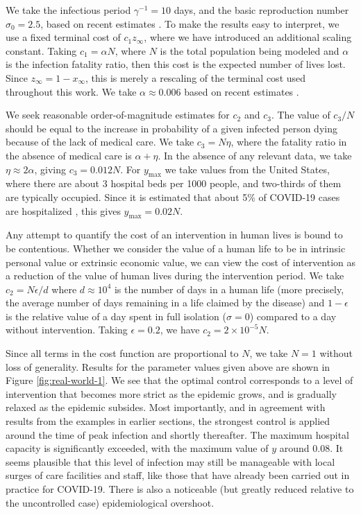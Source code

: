 \documentclass[english,12pt,letter]{article}
\newcommand{\Rnot}{\sigma_0}
\newcommand{\Sinf}{x_\infty}
\newcommand{\ymax}{y_\text{max}}
\begin{document}
We take the infectious period $\gamma^{-1}=10$ days, and the basic reproduction
number $\Rnot=2.5$, based on recent estimates \cite{verity2020estimates,liu2020reproductive}.
To make the results easy to interpret, we use a
fixed terminal cost of $c_1 z_\infty$, where we have introduced an additional
scaling constant.  Taking $c_1 = \alpha N$, where $N$ is the total population
being modeled and $\alpha$ is the infection fatality ratio, then this cost is
the expected number of lives lost.  Since $z_\infty=1-\Sinf$, this is merely a
rescaling of the terminal cost used throughout this work.  We take
$\alpha \approx 0.006$ based on recent estimates \cite{verity2020estimates,russell2020estimating,wu2020estimating}.

We seek reasonable order-of-magnitude estimates for $c_2$ and $c_3$.  
The value of $c_3/N$ should be equal to the increase in probability of a given
infected person dying because of the lack of medical care.  We take
$c_3 = N\eta$,
where the fatality ratio in the absence of medical care is $\alpha+\eta$.
In the absence of any relevant data, we take $\eta\approx 2\alpha$, giving
$c_3 = 0.012N$.  For $\ymax$ we take values from the United States, where
there are about 3 hospital beds per 1000 people, and two-thirds of them
are typically occupied.  Since it is estimated that about 5\% of COVID-19
cases are hospitalized \cite{verity2020estimates}, this gives $\ymax=0.02N$.

Any attempt to quantify the cost of an intervention in human lives is bound
to be contentious.  Whether we consider the value of a human life to be in
intrinsic personal value or extrinsic economic value, we can view the cost
of intervention as a reduction of the value of human lives during the intervention
period.  We take $c_2 = N\epsilon/d$ where $d\approx 10^4$ is the number
of days in a human life (more precisely, the average number of days remaining
in a life claimed by the disease) and $1-\epsilon$ is the relative value of a
day spent in full isolation ($\sigma=0$) compared to a day without intervention.
Taking $\epsilon=0.2$, we have $c_2 = 2\times10^{-5} N$.

Since all terms in the cost function are proportional to $N$, we take $N=1$ without
loss of generality.  Results for the parameter values given above are shown in Figure
\ref{fig:real-world-1}.  We see that the optimal control corresponds to a level
of intervention that becomes more strict as the epidemic grows, and is gradually
relaxed as the epidemic subsides.  Most importantly, and in agreement with results
from the examples in earlier sections, the strongest control is applied around
the time of peak infection and shortly thereafter.
The maximum hospital capacity is significantly exceeded, with the maximum value of $y$
around $0.08$.  It seems plausible that this level of infection may still be manageable with local surges
of care facilities and staff, like those that have already been carried out in practice for COVID-19.
There is also a noticeable (but greatly reduced relative to the uncontrolled case)
epidemiological overshoot.
\end{document}
